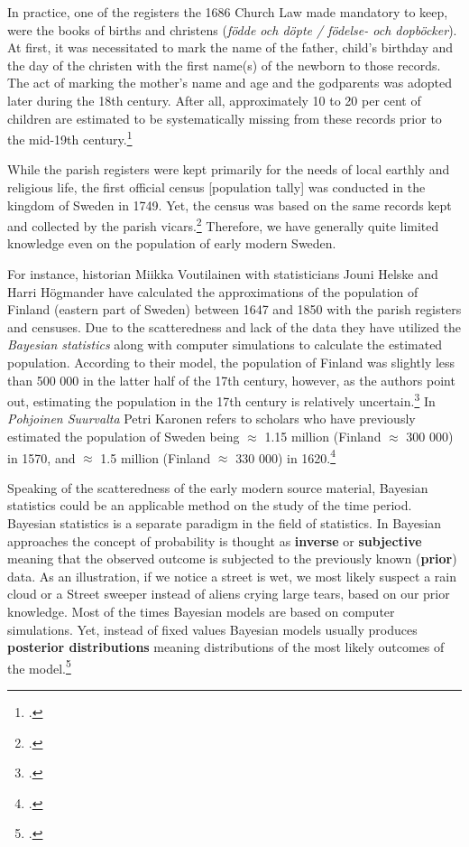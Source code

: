 In practice, one of the registers the 1686 Church Law made mandatory to keep, were the books of births and christens (\textit{födde och döpte / födelse- och dopböcker}). At first, it was necessitated to mark the name of the father, child's birthday and the day of the christen with the first name(s) of the newborn to those records. The act of marking the mother's name and age and the godparents was adopted later during the 18th century. After all, approximately 10 to 20 per cent of children are estimated to be systematically missing from these records prior to the mid-19th century.\footcite{eilola21}

While the parish registers were kept primarily for the needs of local earthly and religious life, the first official census [population tally] was conducted in the kingdom of Sweden in 1749. Yet, the census was based on the same records kept and collected by the parish vicars.\footcite{eilola21b} Therefore, we have generally quite limited knowledge even on the population of early modern Sweden. 

For instance, historian Miikka Voutilainen with statisticians Jouni Helske and Harri Högmander have calculated the approximations of the population of Finland (eastern part of Sweden) between 1647 and 1850 with the parish registers and censuses. Due to the scatteredness and lack of the data they have utilized the \textit{Bayesian statistics} along with computer simulations to calculate the estimated population. According to their model, the population of Finland was slightly less than 500 000 in the latter half of the 17th century, however, as the authors point out, estimating the population in the 17th century is relatively uncertain.\footcite{voutilainenEtAl} In \textit{Pohjoinen Suurvalta} Petri Karonen refers to scholars who have previously estimated the population of Sweden being $\approx$ 1.15 million (Finland $\approx$ 300 000) in 1570, and $\approx$ 1.5 million (Finland $\approx$ 330 000) in 1620.\footcite[pp. 33-34.]{pSuurvalta}

Speaking of the scatteredness of the early modern source material, Bayesian statistics could be an applicable method on the study of the time period. Bayesian statistics is a separate paradigm in the field of statistics. In Bayesian approaches the concept of probability is thought as \textbf{inverse} or \textbf{subjective} meaning that the observed outcome is subjected to the previously known (\textbf{prior}) data. As an illustration, if we notice a street is wet, we most likely suspect a rain cloud or a Street sweeper instead of aliens crying large tears, based on our prior knowledge. Most of the times Bayesian models are based on computer simulations. Yet, instead of fixed values Bayesian models usually produces \textbf{posterior distributions} meaning distributions of the most likely outcomes of the model.\footcites[pp. 16-25.]{kruschke2015}[For an example of posterior distribution see e. g. ][Fig. 3.]{voutilainenEtAl}

